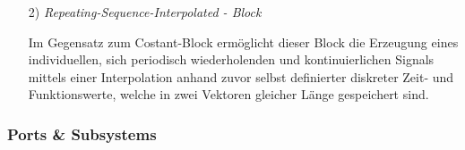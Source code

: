 \documentclass[fontsize = 12pt, paper = a4]{scrreprt}
\begin{document}
\begin{itemize}
\item[2)] \textit{Repeating-Sequence-Interpolated - Block}

Im Gegensatz zum Costant-Block ermöglicht dieser Block die Erzeugung eines individuellen, sich periodisch wiederholenden und kontinuierlichen Signals mittels einer Interpolation anhand zuvor selbst definierter diskreter Zeit- und Funktionswerte, welche in zwei Vektoren gleicher Länge gespeichert sind.

\end{itemize}


\subsubsection{Ports \& Subsystems}
\end{document}
